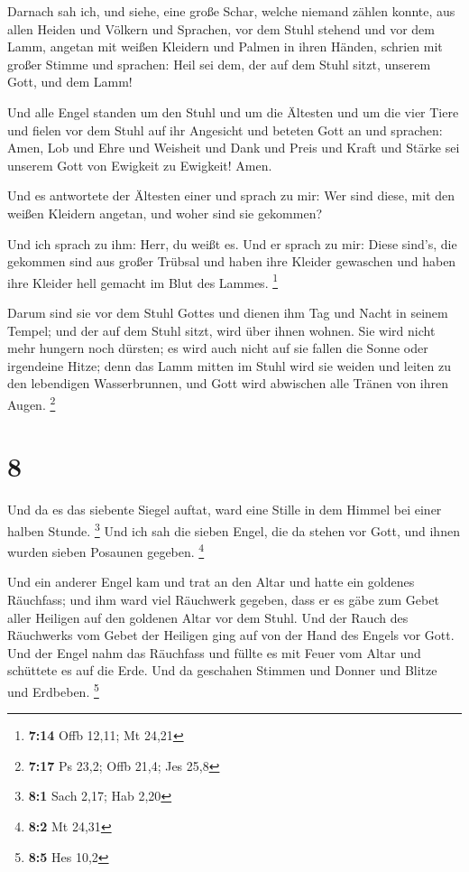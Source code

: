  Darnach sah ich, und siehe, eine große Schar, welche
niemand zählen konnte, aus allen Heiden und Völkern und Sprachen, vor
dem Stuhl stehend und vor dem Lamm, angetan mit weißen Kleidern und
Palmen in ihren Händen,  schrien mit großer Stimme und
sprachen: Heil sei dem, der auf dem Stuhl sitzt, unserem Gott, und dem
Lamm!

 Und alle Engel standen um den Stuhl und um die Ältesten
und um die vier Tiere und fielen vor dem Stuhl auf ihr Angesicht und
beteten Gott an  und sprachen: Amen, Lob und Ehre und
Weisheit und Dank und Preis und Kraft und Stärke sei unserem Gott von
Ewigkeit zu Ewigkeit! Amen.

 Und es antwortete der Ältesten einer und sprach zu mir:
Wer sind diese, mit den weißen Kleidern angetan, und woher sind sie
gekommen?

 Und ich sprach zu ihm: Herr, du weißt es. Und er sprach zu
mir: Diese sind's, die gekommen sind aus großer Trübsal und haben ihre
Kleider gewaschen und haben ihre Kleider hell gemacht im Blut des
Lammes. \footnote{\textbf{7:14} Offb 12,11; Mt 24,21}

 Darum sind sie vor dem Stuhl Gottes und dienen ihm Tag und
Nacht in seinem Tempel; und der auf dem Stuhl sitzt, wird über ihnen
wohnen.  Sie wird nicht mehr hungern noch dürsten; es wird
auch nicht auf sie fallen die Sonne oder irgendeine Hitze; 
denn das Lamm mitten im Stuhl wird sie weiden und leiten zu den
lebendigen Wasserbrunnen, und Gott wird abwischen alle Tränen von ihren
Augen. \footnote{\textbf{7:17} Ps 23,2; Offb 21,4; Jes 25,8}

\hypertarget{section-2}{%
\section{8}\label{section-2}}

 Und da es das siebente Siegel auftat, ward eine Stille in
dem Himmel bei einer halben Stunde. \footnote{\textbf{8:1} Sach 2,17;
  Hab 2,20}  Und ich sah die sieben Engel, die da stehen vor
Gott, und ihnen wurden sieben Posaunen gegeben. \footnote{\textbf{8:2}
  Mt 24,31}

 Und ein anderer Engel kam und trat an den Altar und hatte
ein goldenes Räuchfass; und ihm ward viel Räuchwerk gegeben, dass er es
gäbe zum Gebet aller Heiligen auf den goldenen Altar vor dem Stuhl.
 Und der Rauch des Räuchwerks vom Gebet der Heiligen ging
auf von der Hand des Engels vor Gott.  Und der Engel nahm
das Räuchfass und füllte es mit Feuer vom Altar und schüttete es auf die
Erde. Und da geschahen Stimmen und Donner und Blitze und Erdbeben.
\footnote{\textbf{8:5} Hes 10,2}

